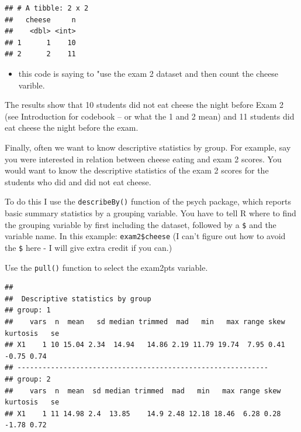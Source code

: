 \documentclass[
]{book}
\newenvironment{Shaded}{\begin{snugshade}}{\end{snugshade}}
\newcommand{\KeywordTok}[1]{\textcolor[rgb]{0.13,0.29,0.53}{\textbf{#1}}}
\newcommand{\NormalTok}[1]{#1}
\newcommand{\OperatorTok}[1]{\textcolor[rgb]{0.81,0.36,0.00}{\textbf{#1}}}
\newcommand{\StringTok}[1]{\textcolor[rgb]{0.31,0.60,0.02}{#1}}
\providecommand{\tightlist}{%
  \setlength{\itemsep}{0pt}\setlength{\parskip}{0pt}}
\begin{document}
\begin{verbatim}
## # A tibble: 2 x 2
##   cheese     n
##    <dbl> <int>
## 1      1    10
## 2      2    11
\end{verbatim}

\begin{itemize}
\tightlist
\item
  this code is saying to "use the exam 2 dataset and then count the cheese varible.
\end{itemize}

The results show that 10 students did not eat cheese the night before Exam 2 (see Introduction for codebook -- or what the 1 and 2 mean) and 11 students did eat cheese the night before the exam.

Finally, often we want to know descriptive statistics by group. For example, say you were interested in relation between cheese eating and exam 2 scores. You would want to know the descriptive statistics of the exam 2 scores for the students who did and did not eat cheese.

To do this I use the \texttt{describeBy()} function of the psych package, which reports basic summary statistics by a grouping variable. You have to tell R where to find the grouping variable by first including the dataset, followed by a \texttt{\$} and the variable name. In this example: \texttt{exam2\$cheese} (I can't figure out how to avoid the \texttt{\$} here - I will give extra credit if you can.)

Use the \texttt{pull()} function to select the exam2pts variable.

\begin{Shaded}
\end{Shaded}

\begin{verbatim}
## 
##  Descriptive statistics by group 
## group: 1
##    vars  n  mean   sd median trimmed  mad   min   max range skew kurtosis   se
## X1    1 10 15.04 2.34  14.94   14.86 2.19 11.79 19.74  7.95 0.41    -0.75 0.74
## ------------------------------------------------------------ 
## group: 2
##    vars  n  mean  sd median trimmed  mad   min   max range skew kurtosis   se
## X1    1 11 14.98 2.4  13.85    14.9 2.48 12.18 18.46  6.28 0.28    -1.78 0.72
\end{verbatim}
\end{document}
